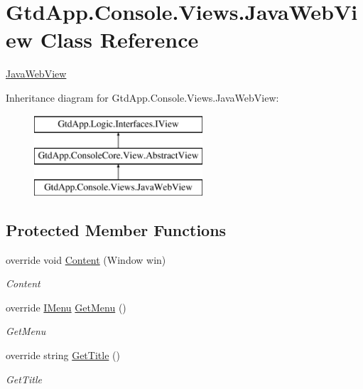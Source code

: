 \hypertarget{class_gtd_app_1_1_console_1_1_views_1_1_java_web_view}{}\section{Gtd\+App.\+Console.\+Views.\+Java\+Web\+View Class Reference}
\label{class_gtd_app_1_1_console_1_1_views_1_1_java_web_view}


\mbox{\hyperlink{class_gtd_app_1_1_console_1_1_views_1_1_java_web_view}{Java\+Web\+View}}  


Inheritance diagram for Gtd\+App.\+Console.\+Views.\+Java\+Web\+View\+:\begin{figure}[H]
\begin{center}
\leavevmode
\includegraphics[height=3.000000cm]{class_gtd_app_1_1_console_1_1_views_1_1_java_web_view}
\end{center}
\end{figure}
\subsection*{Protected Member Functions}
\begin{DoxyCompactItemize}
\item 
override void \mbox{\hyperlink{class_gtd_app_1_1_console_1_1_views_1_1_java_web_view_a1e6174598b11cfe2eac028138c9549a4}{Content}} (Window win)
\begin{DoxyCompactList}\small\item\em Content \end{DoxyCompactList}\item 
override \mbox{\hyperlink{interface_gtd_app_1_1_console_core_1_1_menu_1_1_i_menu}{I\+Menu}} \mbox{\hyperlink{class_gtd_app_1_1_console_1_1_views_1_1_java_web_view_ad7e12e20b33449a8f0b95dbcf47c4602}{Get\+Menu}} ()
\begin{DoxyCompactList}\small\item\em Get\+Menu \end{DoxyCompactList}\item 
override string \mbox{\hyperlink{class_gtd_app_1_1_console_1_1_views_1_1_java_web_view_ac03ca3383ead82e7775e417db086ac76}{Get\+Title}} ()
\begin{DoxyCompactList}\small\item\em Get\+Title \end{DoxyCompactList}\end{DoxyCompactItemize}
